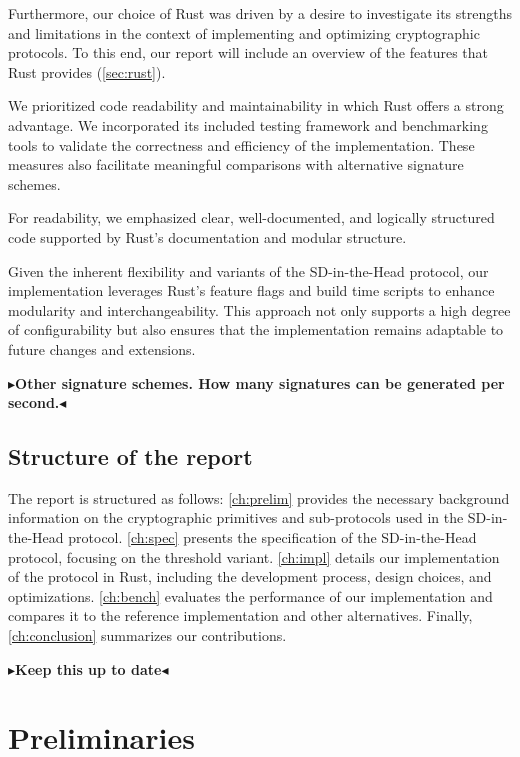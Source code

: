 \documentclass[11pt]{report}
\theoremstyle{definition}
\theoremstyle{plain}
\newcommand{\todo}[1]{{\color[rgb]{.5,0,0}\textbf{$\blacktriangleright$#1$\blacktriangleleft$}}}
\begin{document}
Furthermore, our choice of Rust was driven by a desire to investigate its strengths and limitations in the context of implementing and optimizing cryptographic protocols. To this end, our report will include an overview of the features that Rust provides (\autoref{sec:rust}).

We prioritized code readability and maintainability in which Rust offers a strong advantage. We incorporated its included testing framework and benchmarking tools to validate the correctness and efficiency of the implementation. These measures also facilitate meaningful comparisons with alternative signature schemes.

For readability, we emphasized clear, well-documented, and logically structured code supported by Rust's documentation and modular structure.

Given the inherent flexibility and variants of the SD-in-the-Head protocol, our implementation leverages Rust's feature flags and build time scripts to enhance modularity and interchangeability. This approach not only supports a high degree of configurability but also ensures that the implementation remains adaptable to future changes and extensions.

\todo{Other signature schemes. How many signatures can be generated per second.}

\section{Structure of the report}
The report is structured as follows: \autoref{ch:prelim} provides the necessary background information on the cryptographic primitives and sub-protocols used in the SD-in-the-Head protocol. \autoref{ch:spec} presents the specification of the SD-in-the-Head protocol, focusing on the threshold variant. \autoref{ch:impl} details our implementation of the protocol in Rust, including the development process, design choices, and optimizations. \autoref{ch:bench} evaluates the performance of our implementation and compares it to the reference implementation and other alternatives. Finally, \autoref{ch:conclusion} summarizes our contributions.

\todo{Keep this up to date}


\chapter{Preliminaries}\label{ch:prelim}
\end{document}

